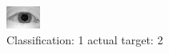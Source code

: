 \begin{figure}[h!]
\begin{center}
\includegraphics[width=0.60\columnwidth]{figures/ID917_class_1_target_2.png}
\end{center}
\caption{ Classification: 1 actual target: 2}
\label{fig:ID917_class_1_target_2}
\end{figure}
